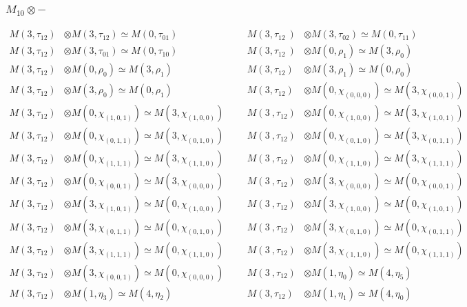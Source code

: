 \subsubsection{$M_10\otimes -$}
\begin{align*}
M(3,\tau_{12}) &\otimes M(3,\tau_{12}) \simeq M(0,\tau_{01}) &&& M(3,\tau_{12}\
) &\otimes M(3,\tau_{02}) \simeq M(0,\tau_{11})\\
M(3,\tau_{12}) &\otimes M(3,\tau_{01}) \simeq M(0,\tau_{10}) &&& M(3,\tau_{12}\
) &\otimes M(0,\rho_{1}) \simeq M(3,\rho_{0})\\
M(3,\tau_{12}) &\otimes M(0,\rho_{0}) \simeq M(3,\rho_{1}) &&& M(3,\tau_{12}) \
&\otimes M(3,\rho_{1}) \simeq M(0,\rho_{0})\\
M(3,\tau_{12}) &\otimes M(3,\rho_{0}) \simeq M(0,\rho_{1}) &&& M(3,\tau_{12}) \
&\otimes M(0,\chi_{(0,0,0)}) \simeq M(3,\chi_{(0,0,1)})\\
M(3,\tau_{12}) &\otimes M(0,\chi_{(1,0,1)}) \simeq M(3,\chi_{(1,0,0)}) &&& M(3\
,\tau_{12}) &\otimes M(0,\chi_{(1,0,0)}) \simeq M(3,\chi_{(1,0,1)})\\
M(3,\tau_{12}) &\otimes M(0,\chi_{(0,1,1)}) \simeq M(3,\chi_{(0,1,0)}) &&& M(3\
,\tau_{12}) &\otimes M(0,\chi_{(0,1,0)}) \simeq M(3,\chi_{(0,1,1)})\\
M(3,\tau_{12}) &\otimes M(0,\chi_{(1,1,1)}) \simeq M(3,\chi_{(1,1,0)}) &&& M(3\
,\tau_{12}) &\otimes M(0,\chi_{(1,1,0)}) \simeq M(3,\chi_{(1,1,1)})\\
M(3,\tau_{12}) &\otimes M(0,\chi_{(0,0,1)}) \simeq M(3,\chi_{(0,0,0)}) &&& M(3\
,\tau_{12}) &\otimes M(3,\chi_{(0,0,0)}) \simeq M(0,\chi_{(0,0,1)})\\
M(3,\tau_{12}) &\otimes M(3,\chi_{(1,0,1)}) \simeq M(0,\chi_{(1,0,0)}) &&& M(3\
,\tau_{12}) &\otimes M(3,\chi_{(1,0,0)}) \simeq M(0,\chi_{(1,0,1)})\\
M(3,\tau_{12}) &\otimes M(3,\chi_{(0,1,1)}) \simeq M(0,\chi_{(0,1,0)}) &&& M(3\
,\tau_{12}) &\otimes M(3,\chi_{(0,1,0)}) \simeq M(0,\chi_{(0,1,1)})\\
M(3,\tau_{12}) &\otimes M(3,\chi_{(1,1,1)}) \simeq M(0,\chi_{(1,1,0)}) &&& M(3\
,\tau_{12}) &\otimes M(3,\chi_{(1,1,0)}) \simeq M(0,\chi_{(1,1,1)})\\
M(3,\tau_{12}) &\otimes M(3,\chi_{(0,0,1)}) \simeq M(0,\chi_{(0,0,0)}) &&& M(3\
,\tau_{12}) &\otimes M(1,\eta_{0}) \simeq M(4,\eta_{5})\\
M(3,\tau_{12}) &\otimes M(1,\eta_{3}) \simeq M(4,\eta_{2}) &&& M(3,\tau_{12}) \
&\otimes M(1,\eta_{1}) \simeq M(4,\eta_{0})\\

\end{align*}
